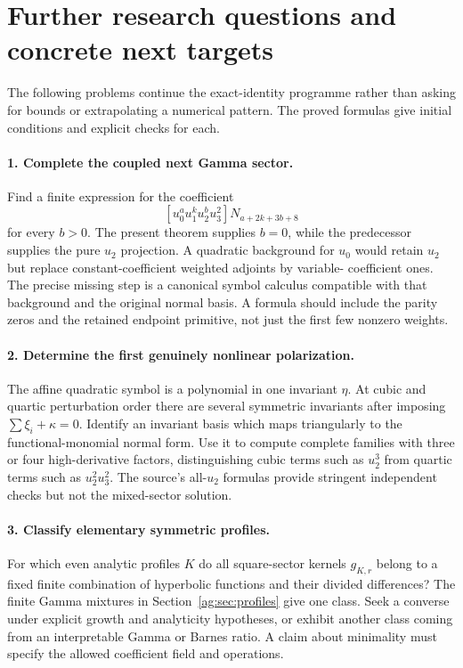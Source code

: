 \section{Further research questions and concrete next targets}
\label{ag:sec:questions}

The following problems continue the exact-identity programme rather
than asking for bounds or extrapolating a numerical pattern. The
proved formulas give initial conditions and explicit checks for each.

\paragraph{1. Complete the coupled next Gamma sector.}
Find a finite expression for the coefficient
\[
 [u_0^a u_1^k u_2^b u_3^2]N_{a+2k+3b+8}
\]
for every $b>0$.
The present theorem supplies $b=0$, while the predecessor supplies the
pure $u_2$ projection. A quadratic background for $u_0$ would retain
$u_2$ but replace constant-coefficient weighted adjoints by variable-
coefficient ones. The precise missing step is a canonical symbol
calculus compatible with that background and the original normal basis.
A formula should include the parity zeros and the retained endpoint
primitive, not just the first few nonzero weights.

\paragraph{2. Determine the first genuinely nonlinear polarization.}
The affine quadratic symbol is a polynomial in one invariant $\eta$.
At cubic and quartic perturbation order there are several symmetric
invariants after imposing $\sum\xi_i+\kappa=0$. Identify an invariant
basis which maps triangularly to the functional-monomial normal form.
Use it to compute complete families with three or four high-derivative
factors, distinguishing cubic terms such as $u_2^3$ from quartic terms
such as $u_2^2u_3^2$. The source's all-$u_2$ formulas provide stringent
independent checks but not the mixed-sector solution.

\paragraph{3. Classify elementary symmetric profiles.}
For which even analytic profiles $K$ do all square-sector kernels
$g_{K,r}$ belong to a fixed finite combination of hyperbolic functions
and their divided differences? The finite Gamma mixtures in
Section~\ref{ag:sec:profiles} give one class. Seek a converse under
explicit growth and analyticity hypotheses, or exhibit another class
coming from an interpretable Gamma or Barnes ratio. A claim about
minimality must specify the allowed coefficient field and operations.

